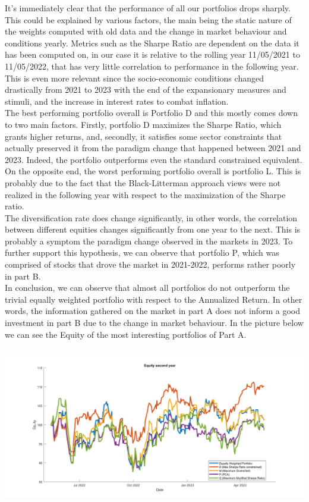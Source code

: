 \documentclass{assignment}
\begin{document}
It's immediately clear that the performance of all our portfolios drops sharply. This could be explained by various factors, the main being the static nature of the weights computed with old data and the change in market behaviour and conditions yearly. Metrics such as the Sharpe Ratio are dependent on the data it has been computed on, in our case it is relative to the rolling year 11/05/2021 to 11/05/2022, that has very little correlation to performance in the following year. This is even more relevant since the socio-economic conditions changed drastically from 2021 to 2023 with the end of the expansionary measures and stimuli, and the increase in interest rates to combat inflation.
\\
The best performing portfolio overall is Portfolio D and this mostly comes down to two main factors.
Firstly, portfolio D maximizes the Sharpe Ratio, which grants higher returns, and, secondly, it satisfies some sector constraints that actually preserved it from the paradigm change that happened between 2021 and 2023.
Indeed, the portfolio outperforms even the standard constrained equivalent.
\\
On the opposite end, the worst performing portfolio overall is portfolio L.
This is probably due to the fact that the Black-Litterman approach views were not realized in the following year with respect to the maximization of the Sharpe ratio.
\\
The diversification rate does change significantly, in other words, the correlation between different equities changes significantly from one year to the next. This is probably a symptom the paradigm change observed in the markets in 2023.
To further support this hypothesis, we can observe that portfolio P, which was comprised of stocks that drove the market in 2021-2022, performs rather poorly in part B. \\
In conclusion, we can observe that almost all portfolios do not outperform the trivial equally weighted portfolio with respect to the Annualized Return. In other words, the information gathered on the market in part A does not inform a good investment in part B due to the change in market behaviour.
In the picture below we can see the Equity of the most interesting portfolios of Part A.

\begin{center}
    \includegraphics[height=7cm]
    {assets/Equity2.png}
\end{center}
\end{document}
